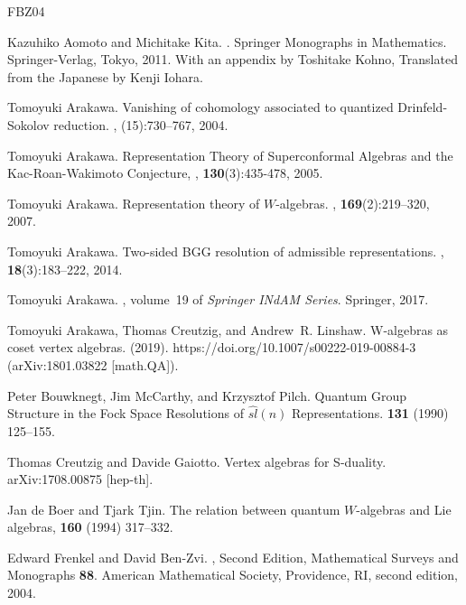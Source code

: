 \documentclass{amsart}
\newcommand{\wh}{\widehat}
\newcommand{\+}{\mathop{\oplus}}
\renewcommand{\*}{{\otimes}}
\theoremstyle{theorem}
\theoremstyle{remark}
\numberwithin{equation}{section}
\begin{document}
\begin{thebibliography}{FBZ04}



Kazuhiko Aomoto and Michitake Kita.
.
\newblock Springer Monographs in Mathematics. Springer-Verlag, Tokyo, 2011.
\newblock With an appendix by Toshitake Kohno, Translated from the Japanese by
  Kenji Iohara.

Tomoyuki Arakawa.
\newblock Vanishing of cohomology associated to quantized {D}rinfeld-{S}okolov
  reduction.
, (15):730--767, 2004.

Tomoyuki Arakawa.
\newblock Representation Theory of Superconformal Algebras and the Kac-Roan-Wakimoto Conjecture, 
, {\bf 130}(3):435-478, 2005.

Tomoyuki Arakawa.
\newblock Representation theory of {$W$}-algebras.
, {\bf 169}(2):219--320, 2007.

Tomoyuki Arakawa.
\newblock Two-sided {BGG} resolution of admissible representations.
, {\bf 18}(3):183--222, 2014.

Tomoyuki Arakawa.
,
  volume~19 of {\em Springer INdAM Series}.
\newblock Springer, 2017.

Tomoyuki Arakawa, Thomas Creutzig, and Andrew~R. Linshaw.
\newblock W-algebras as coset vertex algebras.
(2019). https://doi.org/10.1007/s00222-019-00884-3
(arXiv:1801.03822 [math.QA]).

 Peter Bouwknegt, Jim McCarthy, and Krzysztof Pilch.
\newblock Quantum Group Structure in the Fock Space Resolutions
  of $\wh{sl}(n)$ Representations.
 {\bf 131} (1990) 125--155.

Thomas Creutzig and Davide Gaiotto.
\newblock Vertex algebras for {S}-duality.
\newblock arXiv:1708.00875 [hep-th].

 Jan  de Boer and Tjark Tjin.
\newblock The relation between quantum $W$-algebras and Lie algebras,
 {\bf 160} (1994) 317--332.

Edward Frenkel and David Ben-Zvi.
, Second Edition,
  Mathematical Surveys and Monographs {\bf 88}.
\newblock American Mathematical Society, Providence, RI, second
edition, 2004.


\end{thebibliography}
\end{document}
